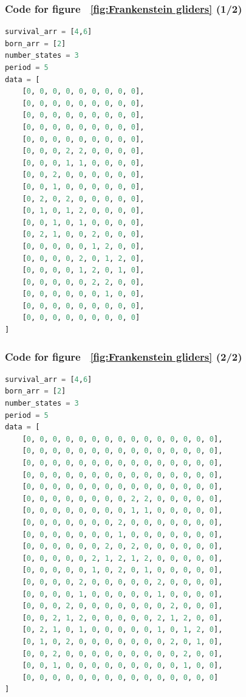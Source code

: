 \documentclass[12pt]{article}
\numberwithin{figure}{section} %
\begin{document}
\subsubsection{Code for figure ~\ref{fig:Frankenstein gliders} (1/2)}
\label{subsubsection:Frankenstein glider one}
\begin{lstlisting}[language = Python]
survival_arr = [4,6]
born_arr = [2]
number_states = 3
period = 5
data = [
    [0, 0, 0, 0, 0, 0, 0, 0, 0],
    [0, 0, 0, 0, 0, 0, 0, 0, 0],
    [0, 0, 0, 0, 0, 0, 0, 0, 0],
    [0, 0, 0, 0, 0, 0, 0, 0, 0],
    [0, 0, 0, 0, 0, 0, 0, 0, 0],
    [0, 0, 0, 2, 2, 0, 0, 0, 0],
    [0, 0, 0, 1, 1, 0, 0, 0, 0],
    [0, 0, 2, 0, 0, 0, 0, 0, 0],
    [0, 0, 1, 0, 0, 0, 0, 0, 0],
    [0, 2, 0, 2, 0, 0, 0, 0, 0],
    [0, 1, 0, 1, 2, 0, 0, 0, 0],
    [0, 0, 1, 0, 1, 0, 0, 0, 0],
    [0, 2, 1, 0, 0, 2, 0, 0, 0],
    [0, 0, 0, 0, 0, 1, 2, 0, 0],
    [0, 0, 0, 0, 2, 0, 1, 2, 0],
    [0, 0, 0, 0, 1, 2, 0, 1, 0],
    [0, 0, 0, 0, 0, 2, 2, 0, 0],
    [0, 0, 0, 0, 0, 0, 1, 0, 0],
    [0, 0, 0, 0, 0, 0, 0, 0, 0],
    [0, 0, 0, 0, 0, 0, 0, 0, 0]
]
\end{lstlisting}

\subsubsection{Code for figure ~\ref{fig:Frankenstein gliders} (2/2)}
\label{subsubsection:Frankenstein glider two}
\begin{lstlisting}[language = Python]
survival_arr = [4,6]
born_arr = [2]
number_states = 3
period = 5
data = [
    [0, 0, 0, 0, 0, 0, 0, 0, 0, 0, 0, 0, 0, 0, 0],
    [0, 0, 0, 0, 0, 0, 0, 0, 0, 0, 0, 0, 0, 0, 0],
    [0, 0, 0, 0, 0, 0, 0, 0, 0, 0, 0, 0, 0, 0, 0],
    [0, 0, 0, 0, 0, 0, 0, 0, 0, 0, 0, 0, 0, 0, 0],
    [0, 0, 0, 0, 0, 0, 0, 0, 0, 0, 0, 0, 0, 0, 0],
    [0, 0, 0, 0, 0, 0, 0, 0, 2, 2, 0, 0, 0, 0, 0],
    [0, 0, 0, 0, 0, 0, 0, 0, 1, 1, 0, 0, 0, 0, 0],
    [0, 0, 0, 0, 0, 0, 0, 2, 0, 0, 0, 0, 0, 0, 0],
    [0, 0, 0, 0, 0, 0, 0, 1, 0, 0, 0, 0, 0, 0, 0],
    [0, 0, 0, 0, 0, 0, 2, 0, 2, 0, 0, 0, 0, 0, 0],
    [0, 0, 0, 0, 0, 2, 1, 2, 1, 2, 0, 0, 0, 0, 0],
    [0, 0, 0, 0, 0, 1, 0, 2, 0, 1, 0, 0, 0, 0, 0],
    [0, 0, 0, 0, 2, 0, 0, 0, 0, 0, 2, 0, 0, 0, 0],
    [0, 0, 0, 0, 1, 0, 0, 0, 0, 0, 1, 0, 0, 0, 0],
    [0, 0, 0, 2, 0, 0, 0, 0, 0, 0, 0, 2, 0, 0, 0],
    [0, 0, 2, 1, 2, 0, 0, 0, 0, 0, 2, 1, 2, 0, 0],
    [0, 2, 1, 0, 1, 0, 0, 0, 0, 0, 1, 0, 1, 2, 0],
    [0, 1, 0, 2, 0, 0, 0, 0, 0, 0, 0, 2, 0, 1, 0],
    [0, 0, 2, 0, 0, 0, 0, 0, 0, 0, 0, 0, 2, 0, 0],
    [0, 0, 1, 0, 0, 0, 0, 0, 0, 0, 0, 0, 1, 0, 0],
    [0, 0, 0, 0, 0, 0, 0, 0, 0, 0, 0, 0, 0, 0, 0]
]
\end{lstlisting}
\end{document}

